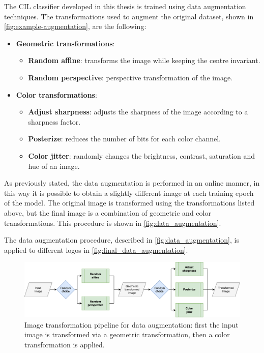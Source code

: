 The CIL classifier developed in this thesis is trained using data augmentation techniques. The transformations used to augment the original dataset, shown in \autoref{fig:example-augmentation}, are the following:
\begin{itemize}
    \item \textbf{Geometric transformations}:
    \begin{itemize}
        \item \textbf{Random affine}: transforms the image while keeping the centre invariant.
        \item \textbf{Random perspective}: perspective transformation of the image.
    \end{itemize}
    \item \textbf{Color transformations}:
    \begin{itemize}
        \item \textbf{Adjust sharpness}: adjusts the sharpness of the image according to a sharpness factor.
        \item \textbf{Posterize}: reduces the number of bits for each color channel.
        \item \textbf{Color jitter}: randomly changes the brightness, contrast, saturation and hue of an image.
    \end{itemize}
\end{itemize}

As previously stated, the data augmentation is performed in an online manner, in this way it is possible to obtain a slightly different image at each training epoch of the model.
The original image is transformed using the transformations listed above, but the final image is a combination of geometric and color transformations. 
This procedure is shown in \autoref{fig:data_augmentation}.

The data augmentation procedure, described in \autoref{fig:data_augmentation}, is applied to different logos in \autoref{fig:final_data_augmentation}.

\begin{figure}%
	\centering

    \begin{center}
        \includegraphics[width=\columnwidth]{images/data_augmentation.drawio.png}
    \end{center}

	\caption{Image transformation pipeline for data augmentation: first the input image is transformed via a geometric transformation, then a color transformation is applied.}%
	\label{fig:data_augmentation}%
\end{figure}

